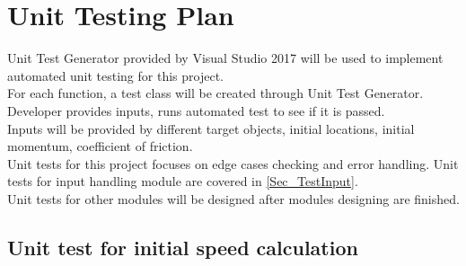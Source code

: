\documentclass[12pt, titlepage]{article}
\begin{document}


					
					
					
					
					

					
					
					
					



				
\section{Unit Testing Plan}
\label{Sec_UnitTest}
Unit Test Generator provided by Visual Studio 2017 will be used to implement automated unit testing for this project.\\
For each function, a test class will be created through Unit Test Generator. Developer provides inputs, runs automated test to see if it is passed.\\
Inputs will be provided by different target objects, initial locations, initial momentum, coefficient of friction. \\
Unit tests for this project focuses on edge cases checking and error handling. Unit tests for input handling module are covered in \ref{Sec_TestInput}.\\ 
Unit tests for other modules will be designed after modules designing are finished.

\subsection{Unit test for initial speed calculation}
\end{document}
